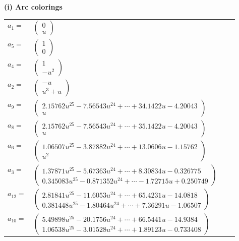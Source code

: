 \documentclass[1p]{elsarticle_modified}
\theoremstyle{definition}
\begin{document}
\flushleft \textbf{(i) Arc colorings}\\
\begin{tabular}{m{7pt} m{180pt} m{7pt} m{180pt} }
\flushright $a_{1}=$&$\begin{pmatrix}0\\u\end{pmatrix}$ \\
\flushright $a_{5}=$&$\begin{pmatrix}1\\0\end{pmatrix}$ \\
\flushright $a_{4}=$&$\begin{pmatrix}1\\- u^2\end{pmatrix}$ \\
\flushright $a_{2}=$&$\begin{pmatrix}- u\\u^3+u\end{pmatrix}$ \\
\flushright $a_{9}=$&$\begin{pmatrix}2.15762 u^{25}-7.56543 u^{24}+\cdots+34.1422 u-4.20043\\u\end{pmatrix}$ \\
\flushright $a_{8}=$&$\begin{pmatrix}2.15762 u^{25}-7.56543 u^{24}+\cdots+35.1422 u-4.20043\\u\end{pmatrix}$ \\
\flushright $a_{6}=$&$\begin{pmatrix}1.06507 u^{25}-3.87882 u^{24}+\cdots+13.0606 u-1.15762\\u^2\end{pmatrix}$ \\
\flushright $a_{3}=$&$\begin{pmatrix}1.37871 u^{25}-5.67363 u^{24}+\cdots+8.30834 u-0.326775\\0.345083 u^{25}-0.871352 u^{24}+\cdots-1.72715 u+0.250749\end{pmatrix}$ \\
\flushright $a_{12}=$&$\begin{pmatrix}2.81841 u^{25}-11.6053 u^{24}+\cdots+65.4231 u-14.0818\\0.381448 u^{25}-1.80464 u^{24}+\cdots+7.36291 u-1.06507\end{pmatrix}$ \\
\flushright $a_{10}=$&$\begin{pmatrix}5.49898 u^{25}-20.1756 u^{24}+\cdots+66.5441 u-14.9384\\1.06538 u^{25}-3.01528 u^{24}+\cdots+1.89123 u-0.733408\end{pmatrix}$ \\

\end{tabular}
\end{document}
